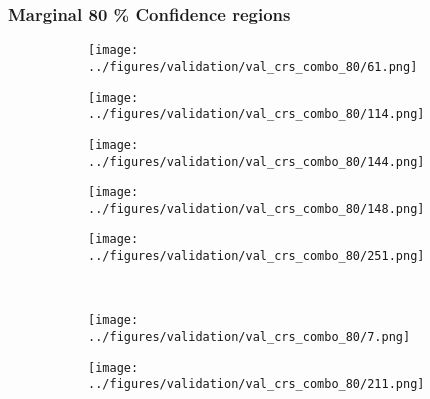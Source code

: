 \subsubsection{Marginal 80 \% Confidence regions}
\begin{figure}[h!]
			\begin{subfigure}[b]{0.03\textwidth} %
		\centering
	\end{subfigure}
	\hspace{0.05cm}
	\begin{subfigure}{0.18\textwidth}
		\centering
		\texttt{[image: ../figures/validation/val\_crs\_combo\_80/61.png]}
		\label{fig:1}
	\end{subfigure}
	\begin{subfigure}{0.18\textwidth}
		\centering
		\texttt{[image: ../figures/validation/val\_crs\_combo\_80/114.png]}
		\label{fig:1}
	\end{subfigure}
	\begin{subfigure}{0.18\textwidth}
		\centering
		\texttt{[image: ../figures/validation/val\_crs\_combo\_80/144.png]}
		\label{fig:1}
	\end{subfigure}
	\begin{subfigure}{0.18\textwidth}
		\centering
		\texttt{[image: ../figures/validation/val\_crs\_combo\_80/148.png]}
		\label{fig:1}
	\end{subfigure}
	\begin{subfigure}{0.18\textwidth}
		\centering
		\texttt{[image: ../figures/validation/val\_crs\_combo\_80/251.png]}
		\label{fig:1}
	\end{subfigure}
	\vspace{-0.35cm}
	\\
			\begin{subfigure}[b]{0.03\textwidth} %
		\centering
	\end{subfigure}
	\hspace{0.05cm}
	\begin{subfigure}{0.18\textwidth}
		\centering
		\texttt{[image: ../figures/validation/val\_crs\_combo\_80/7.png]}
		\label{fig:1}
	\end{subfigure}
	\begin{subfigure}{0.18\textwidth}
		\centering
		\texttt{[image: ../figures/validation/val\_crs\_combo\_80/211.png]}

\end{subfigure}
\end{figure}
